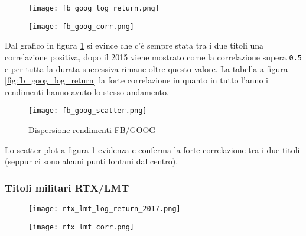 \begin{figure}[h]
  \centering
  \begin{minipage}{.4\textwidth}
    \centering
    \texttt{[image: fb\_goog\_log\_return.png]}
    \label{fig:fb_goog_log_return}
  \end{minipage}%
  \begin{minipage}{.6\textwidth}
    \centering
    \texttt{[image: fb\_goog\_corr.png]}
    \label{fig:fb_goog_corr}
  \end{minipage}
\end{figure}

Dal grafico in figura \ref{fig:fb_goog_corr} si evince che c'è sempre stata tra i due titoli una correlazione positiva, dopo
il 2015 viene mostrato come la correlazione supera \verb|0.5| e per tutta la durata successiva rimane oltre questo valore.
La tabella a figura \ref{fig:fb_goog_log_return} la forte correlazione in quanto in tutto l'anno i rendimenti hanno avuto lo stesso andamento.

\begin{figure}[h]
  \centering
  \texttt{[image: fb\_goog\_scatter.png]}
  \caption{Dispersione rendimenti FB/GOOG}
  \label{fig:fb_goog_disp}
\end{figure}

Lo scatter plot a figura \ref{fig:fb_goog_corr} evidenza e conferma la forte correlazione tra i due titoli (seppur ci sono alcuni punti lontani dal centro).

\pagebreak

\subsubsection{Titoli militari RTX/LMT}

\begin{figure}[h]
  \centering
  \begin{minipage}{.4\textwidth}
    \centering
    \texttt{[image: rtx\_lmt\_log\_return\_2017.png]}
    \label{fig:rtx_lmt_log_return_2017}
  \end{minipage}%
  \begin{minipage}{.6\textwidth}
    \centering
    \texttt{[image: rtx\_lmt\_corr.png]}
    \label{fig:rtx_lmt_corr}
  \end{minipage}
\end{figure}

